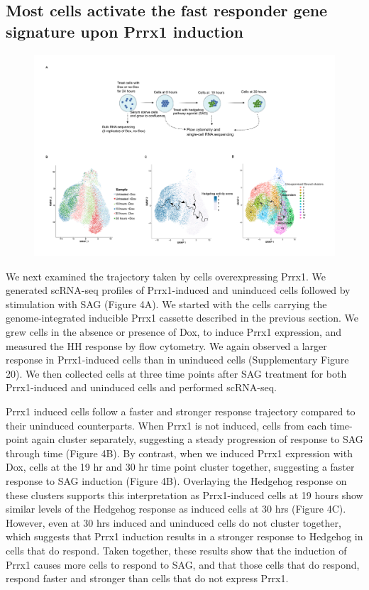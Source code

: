 \subsection{Most cells activate the fast responder gene signature upon Prrx1 induction}
\begin{figure}[t!]  
    \centering
    \includegraphics[width=\linewidth]{figures/hedgehog/hh_figure4.png}
    \caption[]{%
        \textbf{}
    }
    \label{fig:hh_figure4}
\end{figure}
We next examined the trajectory taken by cells overexpressing Prrx1. We generated scRNA-seq profiles of Prrx1-induced and uninduced cells followed by stimulation with SAG (Figure 4A). We started with the cells carrying the genome-integrated inducible Prrx1 cassette described in the previous section. We grew cells in the absence or presence of Dox, to induce Prrx1 expression, and measured the HH response by flow cytometry. We again observed a larger response in Prrx1-induced cells than in uninduced cells (Supplementary Figure 20). We then collected cells at three time points after SAG treatment for both Prrx1-induced and uninduced cells and performed scRNA-seq.

Prrx1 induced cells follow a faster and stronger response trajectory compared to their uninduced counterparts. When Prrx1 is not induced, cells from each time-point again cluster separately, suggesting a steady progression of response to SAG through time (Figure 4B). By contrast, when we induced Prrx1 expression with Dox, cells at the 19 hr and 30 hr time point cluster together, suggesting a faster response to SAG induction (Figure 4B). Overlaying the Hedgehog response on these clusters supports this interpretation as Prrx1-induced cells at 19 hours show similar levels of the Hedgehog response as induced cells at 30 hrs (Figure 4C). However, even at 30 hrs induced and uninduced cells do not cluster together, which suggests that Prrx1 induction results in a stronger response to Hedgehog in cells that do respond. Taken together, these results show that the induction of Prrx1 causes more cells to respond to SAG, and that those cells that do respond, respond faster and stronger than cells that do not express Prrx1.

